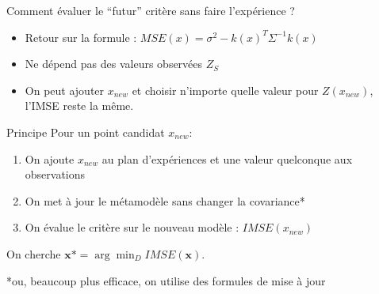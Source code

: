 \begin{frame}{Comment évaluer le ``futur'' critère sans faire l'expérience ?}
 \begin{itemize}
  \item Retour sur la formule : $MSE(x) = \sigma^2 - k(x)^T \Sigma^{-1} k(x)$
  \item Ne dépend pas des valeurs observées $Z_S$
  \item On peut ajouter $x_{new}$ et choisir n'importe quelle valeur pour $Z(x_{new})$, l'IMSE reste la même.
 \end{itemize}
 
 \begin{block}{Principe}
Pour un point candidat $x_{new}$:
\begin{enumerate}
	\item On ajoute $x_{new}$ au plan d'expériences et une valeur quelconque aux observations
	\item On met à jour le métamodèle sans changer la covariance*
	\item On évalue le critère sur le nouveau modèle : $IMSE(x_{new})$
\end{enumerate}
On cherche $\mathbf{x}* = \arg \min_D IMSE(\mathbf{x})$.
\end{block}
\scriptsize{*ou, beaucoup plus efficace, on utilise des formules de mise à jour}
\end{frame}

